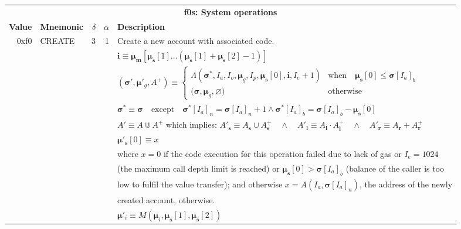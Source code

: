 \documentclass[9pt,oneside]{amsart}
\begin{document}
\begin{tabular*}{\columnwidth}[h]{rlrrl}
\toprule
\multicolumn{5}{c}{\textbf{f0s: System operations}} \vspace{5pt} \\
\textbf{Value} & \textbf{Mnemonic} & $\delta$ & $\alpha$ & \textbf{Description} \vspace{5pt} \\
0xf0 & {\small CREATE} & 3 & 1 & Create a new account with associated code. \\
&&&& $\mathbf{i} \equiv \boldsymbol{\mu}_\mathbf{m}[ \boldsymbol{\mu}_\mathbf{s}[1] \dots (\boldsymbol{\mu}_\mathbf{s}[1] + \boldsymbol{\mu}_\mathbf{s}[2] - 1) ]$ \\
&&&& $(\boldsymbol{\sigma}', \boldsymbol{\mu}'_g, A^+) \equiv \begin{cases}\Lambda(\boldsymbol{\sigma}^*, I_a, I_o, \boldsymbol{\mu}_g, I_p, \boldsymbol{\mu}_\mathbf{s}[0], \mathbf{i}, I_e + 1) & \text{when} \quad \boldsymbol{\mu}_\mathbf{s}[0] \leqslant \boldsymbol{\sigma}[I_a]_b \\ \big(\boldsymbol{\sigma}, \boldsymbol{\mu}_g, \varnothing\big) & \text{otherwise} \end{cases}$ \\
&&&& $\boldsymbol{\sigma}^* \equiv \boldsymbol{\sigma} \quad \text{except} \quad \boldsymbol{\sigma}^*[I_a]_n = \boldsymbol{\sigma}[I_a]_n + 1 \wedge \boldsymbol{\sigma}^*[I_a]_b = \boldsymbol{\sigma}[I_a]_b - \boldsymbol{\mu}_\mathbf{s}[0]$ \\
&&&& $A' \equiv A \Cup A^+$ which implies: $A'_\mathbf{s} \equiv A_\mathbf{s} \cup A^+_\mathbf{s} \quad \wedge \quad A'_\mathbf{l} \equiv A_\mathbf{l} \cdot A^+_\mathbf{l} \quad \wedge \quad A'_\mathbf{r} \equiv A_\mathbf{r} + A^+_\mathbf{r}$ \\
&&&& $\boldsymbol{\mu}'_\mathbf{s}[0] \equiv x$ \\
&&&& where $x=0$ if the code execution for this operation failed due to lack of gas or $I_e = 1024$ \\
&&&& (the maximum call depth limit is reached) or $\boldsymbol{\mu}_\mathbf{s}[0] > \boldsymbol{\sigma}[I_a]_b$ (balance of the caller is too \\
&&&& low to fulfil the value transfer); and otherwise $x=A(I_a, \boldsymbol{\sigma}[I_a]_n)$, the address of the newly \\
&&&& created account, otherwise. \\
&&&& $\boldsymbol{\mu}'_i \equiv M(\boldsymbol{\mu}_i, \boldsymbol{\mu}_\mathbf{s}[1], \boldsymbol{\mu}_\mathbf{s}[2])$ \\

\end{tabular*}
\end{document}
